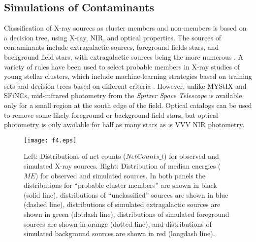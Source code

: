 \documentclass[twocolumn,tighten]{aastex61}
\begin{document}
\subsection{Simulations of Contaminants \label{contam.sec}}

Classification of X-ray sources as cluster members and non-members is based on a decision tree, using X-ray, NIR, and optical properties. The sources of contaminants include extragalactic sources, foreground fields stars, and background field stars, with extragalactic sources being the more numerous \citep{2011ApJS..194....3G}. A variety of rules have been used to select probable members in X-ray studies of young stellar clusters, which include machine-learning strategies based on training sets \citep[e.g.,][]{2013ApJS..209...32B} and decision trees based on different criteria \citep[e.g.,][]{2017ApJS..229...28G}. However, unlike MYStIX and SFiNCs, mid-infrared photometry from the {\it Spitzer Space Telescope} is available only for a small region at the south edge of the field. Optical catalogs can be used to remove some likely foreground or background field stars, but optical photometry is only available for half as many stars as is VVV NIR photometry.

\begin{figure*}[t]
\centering
\texttt{[image: f4.eps]} 
\caption{Left: Distributions of net counts ($NetCounts\_t$) for observed and simulated X-ray sources. Right: Distribution of median energies ($ME$) for observed and simulated sources. In both panels the distributions for ``probable cluster members'' are shown in black (solid line), distributions of ``unclassified'' sources are shown in blue (dashed line), distributions of simulated extragalactic sources are shown in green (dotdash line), distributions of simulated foreground sources are shown in orange (dotted line), and distributions of simulated background sources are shown in red (longdash line).
\label{sim.fig}}
\end{figure*}
\end{document}
